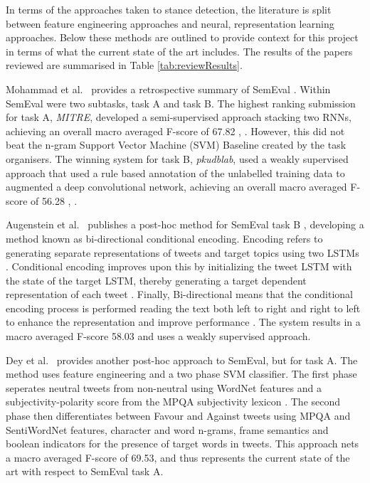 \documentclass[Dissertation.tex]{subfiles}
\begin{document}
In terms of the approaches taken to stance detection, the literature is split between feature engineering approaches and neural, representation learning approaches. Below these methods are outlined to provide context for this project in terms of what the current state of the art includes. The results of the papers reviewed are summarised in Table \ref{tab:reviewResults}.

Mohammad et al.\ \cite{mohammadSemEval2016TaskDetecting2016} provides a retrospective summary of SemEval \cite{TaskDetectingStance} . Within SemEval \cite{TaskDetectingStance} were two subtasks, task A and task B. The highest ranking submission for task A,\textit{ MITRE}, developed a semi-supervised approach stacking two RNNs, achieving an overall macro averaged F-score of 67.82 \cite{mohammadSemEval2016TaskDetecting2016}, \cite{zarrellaMITRESemEval2016Task2016}. However, this did not beat the n-gram Support Vector Machine (SVM) Baseline created by the task organisers. The winning system for task B, \textit{pkudblab}, used a weakly supervised approach that used a rule based annotation of the unlabelled training data to augmented a deep convolutional network, achieving an overall macro averaged F-score of 56.28 \cite{mohammadSemEval2016TaskDetecting2016}, \cite{weiPkudblabSemEval2016Task2016}.

Augenstein et al.\ \cite{augensteinStanceDetectionBidirectional2016} publishes a post-hoc method for SemEval task B \cite{TaskDetectingStance}, developing a method known as bi-directional conditional encoding. Encoding refers to generating separate representations of tweets and target topics using two LSTMs \cite{augensteinStanceDetectionBidirectional2016}\cite{hochreiterLongShorttermMemory1997}. Conditional encoding improves upon this by initializing the tweet LSTM with the state of the target LSTM, thereby generating a target dependent representation of each tweet \cite{augensteinStanceDetectionBidirectional2016}. Finally, Bi-directional means that the conditional encoding process is performed reading the text both left to right and right to left to enhance the representation and improve performance \cite{augensteinStanceDetectionBidirectional2016}. The system results in a macro averaged F-score 58.03 and uses a weakly supervised approach.

Dey et al.\ \cite{deyTwitterStanceDetection2017} provides another post-hoc approach to SemEval, but for task A. The method uses feature engineering and a two phase SVM classifier. The first phase seperates neutral tweets from non-neutral using WordNet \cite{WordNetLexicalDatabase} features and a subjectivity-polarity score from the MPQA subjectivity lexicon \cite{SubjectivityLexiconMPQA}. The second phase then differentiates between Favour and Against tweets using MPQA and SentiWordNet \cite{SentiWordNet} features, character and word n-grams, frame semantics and boolean indicators for the presence of target words in tweets. This approach nets a macro averaged F-score of 69.53, and thus represents the current state of the art with respect to SemEval task A.
\end{document}
